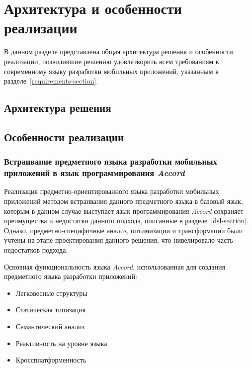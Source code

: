 \section{Архитектура и особенности реализации}
В данном разделе представлена общая архитектура решения и особенности реализации, позволившие решению удовлетворить всем требованиям к
современному языку разработки мобильных приложений, указанным в разделе~\ref{requirements-section}.

\subsection{Архитектура решения}

\subsection{Особенности реализации}
\subsubsection*{Встраивание предметного языка разработки мобильных приложений в язык программирования \textit{Accord}}
Реализация предметно-ориентированного языка разработки мобильных приложений
методом встраивания данного предметного языка в базовый язык, которым в
данном случае выступает язык программирования \textit{Accord} сохраняет
преимущества и недостатки данного подхода, описанные в разделе~\ref{dsl-section}.
Однако, предметно-специфичные анализ, оптимизации и трансформации были
учтены на этапе проектирования данного решения, что нивелировало часть
недостатков подхода.

Основная функциональность языка \textit{Accord}, использованная для
создания предметного языка разработки приложений:
\begin{itemize}
	\item Легковесные структуры
	\item Статическая типизация
	\item Семантический анализ
	\item Реактивность на уровне языка
	\item Кроссплатформенность
\end{itemize}


